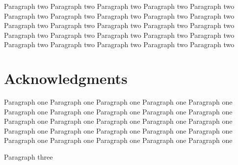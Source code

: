 \documentclass[10pt,journal,final,a4paper,nofonttune]{IEEEtran}
\begin{document}
Paragraph two Paragraph two Paragraph two Paragraph two Paragraph two 
Paragraph two Paragraph two Paragraph two Paragraph two Paragraph two 
Paragraph two Paragraph two Paragraph two Paragraph two Paragraph two 
Paragraph two Paragraph two Paragraph two Paragraph two Paragraph two 
Paragraph two Paragraph two Paragraph two Paragraph two Paragraph two 

\section*{Acknowledgments}

Paragraph one Paragraph one Paragraph one Paragraph one Paragraph one 
Paragraph one Paragraph one Paragraph one Paragraph one Paragraph one 
Paragraph one Paragraph one Paragraph one Paragraph one Paragraph one 
Paragraph one Paragraph one Paragraph one Paragraph one Paragraph one 
Paragraph one Paragraph one Paragraph one Paragraph one Paragraph one 

Paragraph three



\end{document}
